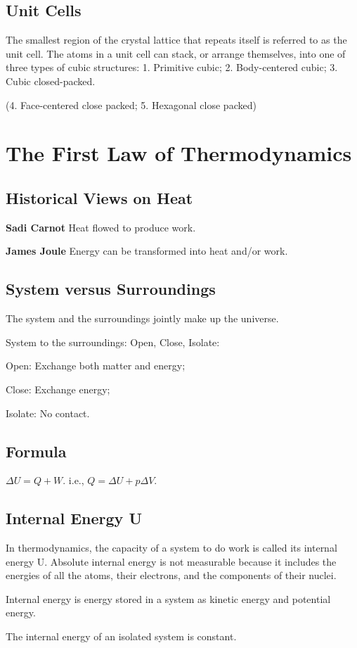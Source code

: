 \documentclass[a4paper,12pt]{article}
\begin{document}
\subsection{Unit Cells}
The smallest region of the crystal lattice that repeats itself is referred to as the unit cell. The atoms in a unit cell can stack,
or arrange themselves, into one of three types of cubic structures: 1. Primitive cubic; 2. Body-centered cubic; 3. Cubic closed-packed.\par
\noindent(4. Face-centered close packed; 5. Hexagonal close packed)



\newpage
\section{The First Law of Thermodynamics}
\subsection{Historical Views on Heat}
\textbf{Sadi Carnot} Heat flowed to produce work.\par
\textbf{James Joule} Energy can be transformed into heat and/or work.\par
\subsection{System versus Surroundings}
The system and the surroundings jointly make up the universe.\par
System to the surroundings: Open, Close, Isolate:\par
Open: Exchange both matter and energy;\par
Close: Exchange energy;\par
Isolate: No contact.
\subsection{Formula}
$\Delta U = Q + W$. i.e., $Q=\Delta U+p\Delta V$.
\subsection{Internal Energy U}
In thermodynamics, the capacity of a system to do work is called its internal energy U. Absolute internal energy is not measurable because it includes the energies of all the atoms, their electrons, and the components of their nuclei.\par
Internal energy is energy stored in a system as kinetic energy and potential energy.\par
The internal energy of an isolated system is constant.
\end{document}
